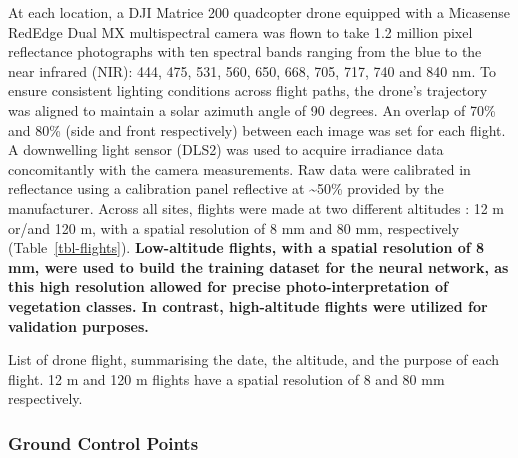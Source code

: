 \documentclass[
  number]{elsarticle}
\begin{document}
At each location, a DJI Matrice 200 quadcopter drone equipped with a
Micasense RedEdge Dual MX multispectral camera was flown to take 1.2
million pixel reflectance photographs with ten spectral bands ranging
from the blue to the near infrared (NIR): 444, 475, 531, 560, 650, 668,
705, 717, 740 and 840 nm. To ensure consistent lighting conditions
across flight paths, the drone's trajectory was aligned to maintain a
solar azimuth angle of 90 degrees. An overlap of 70\% and 80\% (side and
front respectively) between each image was set for each flight. A
downwelling light sensor (DLS2) was used to acquire irradiance data
concomitantly with the camera measurements. Raw data were calibrated in
reflectance using a calibration panel reflective at \textasciitilde50\%
provided by the manufacturer. Across all sites, flights were made at two
different altitudes : 12 m or/and 120 m, with a spatial resolution of 8
mm and 80 mm, respectively (Table~\ref{tbl-flights}).
\textbf{Low-altitude flights, with a spatial resolution of 8 mm, were
used to build the training dataset for the neural network, as this high
resolution allowed for precise photo-interpretation of vegetation
classes. In contrast, high-altitude flights were utilized for validation
purposes.}

\begin{table}

\caption{\label{tbl-flights}List of drone flight, summarising the date,
the altitude, and the purpose of each flight. 12 m and 120 m flights
have a spatial resolution of 8 and 80 mm respectively.}


\end{table}%

\subsubsection{Ground Control Points}\label{ground-control-points}
\end{document}
